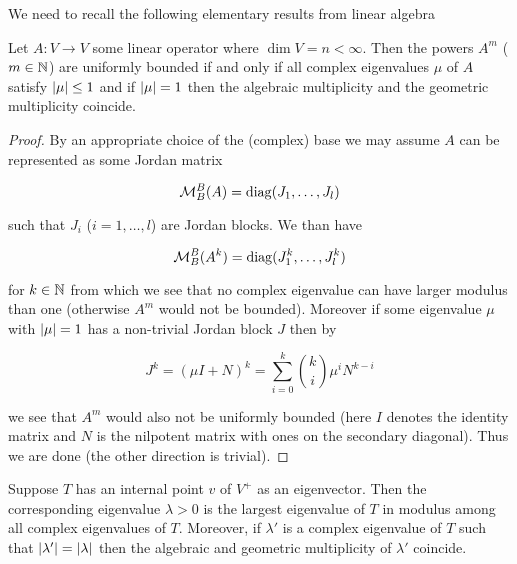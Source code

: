 \documentclass{article}
\begin{document}
We need to recall the following elementary results from linear algebra

\begin{lemma}\label{lem4}
Let $A:V\to V$ some linear operator where $\dim{V}=n<\infty$. Then the powers $A^m$ ($m\in\mathbb{N}$) are uniformly bounded if and only if all complex eigenvalues $\mu$ of $A$ satisfy $\left| \mu\right|\leq 1$ and if $\left| \mu\right|=1$ then the algebraic multiplicity and the geometric multiplicity coincide.
\end{lemma}

\begin{proof}
By an appropriate choice of the (complex) base we may assume $A$ can be represented as some Jordan matrix

\begin{equation}
\mathcal{M}_B^B(A)=\operatorname{diag}(J_1,\ldots,J_l)
\end{equation}

such that $J_i$ ($i=1,\ldots,l$) are Jordan blocks. We than have

\begin{equation}
\mathcal{M}_B^B(A^k)=\operatorname{diag}(J^k_1,\ldots,J^k_l)
\end{equation}

for $k\in\mathbb{N}$ from which we see that no complex eigenvalue can have larger modulus than one (otherwise $A^m$ would not be bounded). Moreover if some eigenvalue $\mu$ with $\left| \mu\right|=1$ has a non-trivial Jordan block $J$ then by

\begin{equation}
J^k=(\mu I + N)^k =\sum_{i=0}^k{{k \choose i}\mu^i N^{k-i}}
\end{equation}

we see that $A^m$ would also not be uniformly bounded (here $I$ denotes the identity matrix and $N$ is the nilpotent matrix with ones on the secondary diagonal). Thus we are done (the other direction is trivial).
\end{proof}

\begin{lemma}\label{lem5}
Suppose $T$ has an internal point $v$ of $V^+$ as an eigenvector. Then the corresponding eigenvalue $\lambda>0$ is the largest eigenvalue of $T$ in modulus among all complex eigenvalues of $T$. Moreover, if $\lambda'$ is a complex eigenvalue of $T$ such that $\left| \lambda'\right|=\left| \lambda\right|$ then the algebraic and geometric multiplicity of $\lambda'$ coincide.
\end{lemma}
\end{document}
